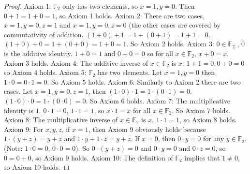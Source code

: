 \documentclass[12pt]{article}
\newcommand{\bbF}{\mathbb{F}}
\renewcommand{\_}[1]{\underline{ #1 }}
\theoremstyle{definition}
\newtheorem{exercise}[theorem]{Exercise}
\numberwithin{equation}{subsection}
\begin{document}
\begin{proof}
Axiom 1: $\bbF_2$ only has two elements, so $x = 1, y = 0$. Then $0 + 1 = 1 + 0 = 1$, so Axiom 1 holds. \newline
Axiom 2: There are two cases, $x = 1, y = 0, z = 1$ and $x = 1, y = 0, z = 0$ (the other cases are covered by commutativity of addition. $(1 + 0) + 1 = 1 + (0 + 1) = 1 + 1 = 0$. $(1 + 0) + 0 = 1 + (0 + 0) = 1 + 0 = 1$. So Axiom 2 holds. \newline
Axiom 3: $0 \in \bbF_2$ , $0$ is the additive identity. $1 + 0 = 1$ and $0 + 0 = 0$ so for all $x \in \bbF_2$, $x + 0 = x$. Axiom 3 holds. \newline
Axiom 4: The additive inverse of $x \in \bbF_2$ is $x$. $1 + 1 = 0, 0 + 0 = 0$ so Axiom 4 holds. \newline
Axiom 5: $\bbF_2$ has two elements. Let $x = 1, y = 0$ then $1 \cdot 0 = 0 \cdot 1 = 0$. So Axiom 5 holds. \newline
Axiom 6: Similarly to Axiom 2 there are two cases. Let $x = 1, y = 0, z = 1$, then $(1 \cdot 0) \cdot 1 = 1 \cdot (0 \cdot 1) = 0$. $(1 \cdot 0) \cdot 0 = 1 \cdot (0 \cdot 0) = 0$. So Axiom 6 holds. \newline
Axiom 7: The multiplicative identity is $1$. $0 \cdot 1 = 0$, $1 \cdot 1 = 1$, so $x \cdot 1 = x$ for all $x \in \bbF_2$. So Axiom 7 holds. \newline
Axiom 8: The multiplicative inverse of $x \in \bbF_2$ is $x$. $1 \cdot 1 = 1$, so Axiom 8 holds. \newline
Axiom 9: For $x,y,z$, if $x = 1$, then Axiom 9 obviously holds because $1 \cdot (y + z) = y + z$ and $1 \cdot y + 1 \cdot z = y + z$. If $x = 0$, then $0 \cdot y = 0$ for any $y \in \bbF_2$. (Note: $1 \cdot 0 = 0$, $0 \cdot 0 = 0$). So $0 \cdot (y + z) = 0$ and $0 \cdot y = 0$ and $0 \cdot z = 0$, so $0 = 0 + 0$, so Axiom 9 holds. \newline
Axiom 10: The definition of $\bbF_2$ implies that $1 \not = 0$, so Axiom 10 holds.
\end{proof}

\end{document}
